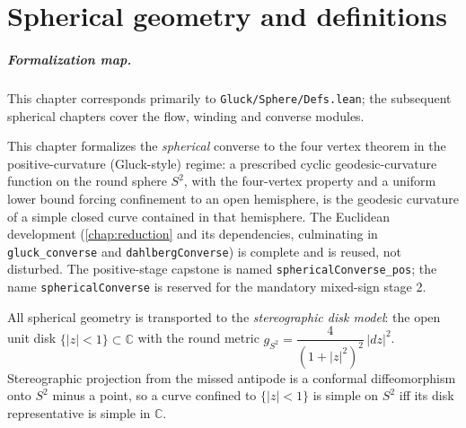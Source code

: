 \chapter{Spherical geometry and definitions}
\label{chap:sphere}

\paragraph{Formalization map.}
This chapter corresponds primarily to \texttt{Gluck/Sphere/Defs.lean}; the
subsequent spherical chapters cover the flow, winding and converse modules.

This chapter formalizes the \emph{spherical} converse to the four vertex theorem in
the positive-curvature (Gluck-style) regime: a prescribed cyclic geodesic-curvature
function on the round sphere $S^2$, with the four-vertex property and a uniform lower
bound forcing confinement to an open hemisphere, is the geodesic curvature of a simple
closed curve contained in that hemisphere. The Euclidean development
(\cref{chap:reduction} and its dependencies, culminating in \texttt{gluck\_converse} and
\texttt{dahlbergConverse}) is complete and is reused, not disturbed. The positive-stage
capstone is named \texttt{sphericalConverse\_pos}; the name \texttt{sphericalConverse} is
reserved for the mandatory mixed-sign stage 2.

All spherical geometry is transported to the \emph{stereographic disk model}: the open
unit disk $\{|z|<1\}\subset\mathbb C$ with the round metric
$g_{S^2}=\dfrac{4}{(1+|z|^2)^2}\,|dz|^2$. Stereographic projection from the missed
antipode is a conformal diffeomorphism onto $S^2$ minus a point, so a curve confined to
$\{|z|<1\}$ is simple on $S^2$ iff its disk representative is simple in $\mathbb C$.


